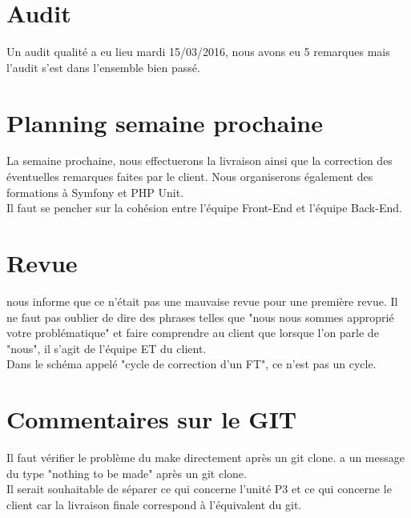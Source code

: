 \documentclass [a4paper] {article}
\begin{document}
\section{Audit}
Un audit qualité a eu lieu mardi 15/03/2016, nous avons eu 5 remarques mais l'audit s'est dans l'ensemble bien passé.


\section{Planning semaine prochaine}
La semaine prochaine, nous effectuerons la livraison ainsi que la correction des éventuelles remarques faites par le client. Nous organiserons également des formations à Symfony et PHP Unit. \\
Il faut se pencher sur la cohésion entre l'équipe Front-End et l'équipe Back-End.


\section{Revue}
\nomTuteurPedago{} nous informe que ce n'était pas une mauvaise revue pour une première revue. Il ne faut pas oublier de dire des phrases telles que "nous nous sommes approprié votre problématique" et faire comprendre au client que lorsque l'on parle de "nous", il s'agit de l'équipe ET du client. \\
Dans le schéma appelé "cycle de correction d'un FT", ce n'est pas un cycle.



\section{Commentaires sur le GIT}
Il faut vérifier le problème du make directement après un git clone. \nomTuteurPedago{} a un message du type "nothing to be made" après un git clone. \\
Il serait souhaitable de séparer ce qui concerne l'unité P3 et ce qui concerne le client car la livraison finale correspond à l'équivalent du git.


\newpage
\end{document}
